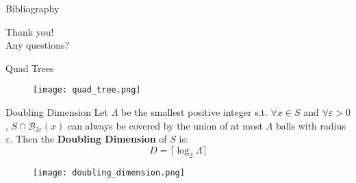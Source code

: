 \documentclass[aspectratio=169]{beamer}
\renewcommand{\epsilon}{\varepsilon}
\newcommand{\B}[2]{\mathcal{B}_{#1}\left(#2\right)}
\begin{document}
\begin{frame}{Bibliography}
    
    
\end{frame}

\begin{emptyframe}
    Thank you!\\
    Any questions?
\end{emptyframe}


\begin{frame}{Quad Trees}
    \begin{figure}
        \centering
        \texttt{[image: quad\_tree.png]}
    \end{figure}
\end{frame}

\begin{frame}{Doubling Dimension}
    Let $\Lambda$ be the smallest positive integer s.t. $\forall x\in S$ and $\forall \epsilon>0$, $S\cap\B{2\epsilon}{x}$ can always be covered by the union of at most $\Lambda$ balls with radius $\epsilon$.
    Then the \textbf{Doubling Dimension} of $S$ is:
    \[D = \lceil\log_2\Lambda\rceil\]

    \begin{figure}
        \centering
        \texttt{[image: doubling\_dimension.png]}
    \end{figure}
\end{frame}
\end{document}

